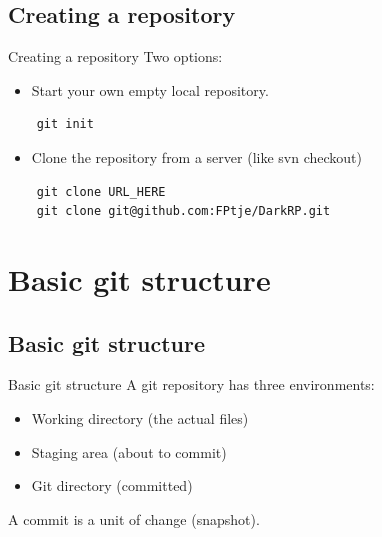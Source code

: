\documentclass[10pt,a4paper]{beamer}
\begin{document}
\subsection{Creating a repository}
\begin{frame}[fragile]{Creating a repository}
Two options:

\begin{itemize}
\item Start your own empty local repository.
\end{itemize}

	\begin{verbatim}
	git init
	\end{verbatim}

\begin{itemize}
\item Clone the repository from a server (like svn checkout)
\end{itemize}

	\begin{verbatim}
	git clone URL_HERE
	git clone git@github.com:FPtje/DarkRP.git
	\end{verbatim}
\end{frame}


\section{Basic git structure}
\subsection{Basic git structure}
\begin{frame}{Basic git structure}
A git repository has three environments:
\begin{itemize}
\item Working directory (the actual files)
\item Staging area (about to commit)
\item Git directory (committed)
\end{itemize}

A commit is a unit of change (snapshot).
\end{frame}
\end{document}

